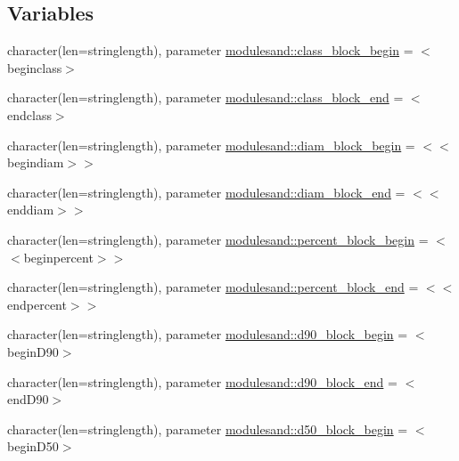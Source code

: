 \subsection*{Variables}
\begin{DoxyCompactItemize}
\item 
character(len=stringlength), parameter \mbox{\hyperlink{namespacemodulesand_a795643cefd171a7db1134d23315ba7d6}{modulesand\+::class\+\_\+block\+\_\+begin}} = \textquotesingle{}$<$beginclass$>$\textquotesingle{}
\item 
character(len=stringlength), parameter \mbox{\hyperlink{namespacemodulesand_a4998e9d59abb169c48298b823f3233eb}{modulesand\+::class\+\_\+block\+\_\+end}} = \textquotesingle{}$<$endclass$>$\textquotesingle{}
\item 
character(len=stringlength), parameter \mbox{\hyperlink{namespacemodulesand_add435f0a101432372b5402d3e60ff9f7}{modulesand\+::diam\+\_\+block\+\_\+begin}} = \textquotesingle{}$<$$<$begindiam$>$$>$\textquotesingle{}
\item 
character(len=stringlength), parameter \mbox{\hyperlink{namespacemodulesand_a060d45bf13a22de07462deb2c0661360}{modulesand\+::diam\+\_\+block\+\_\+end}} = \textquotesingle{}$<$$<$enddiam$>$$>$\textquotesingle{}
\item 
character(len=stringlength), parameter \mbox{\hyperlink{namespacemodulesand_ab5cb49dc51d45faf18b962a5c3f85a93}{modulesand\+::percent\+\_\+block\+\_\+begin}} = \textquotesingle{}$<$$<$beginpercent$>$$>$\textquotesingle{}
\item 
character(len=stringlength), parameter \mbox{\hyperlink{namespacemodulesand_aae26fa01d2e146d7d5f278f77a70fa34}{modulesand\+::percent\+\_\+block\+\_\+end}} = \textquotesingle{}$<$$<$endpercent$>$$>$\textquotesingle{}
\item 
character(len=stringlength), parameter \mbox{\hyperlink{namespacemodulesand_ac8ea818b42ebdcf5d37ba24d99c1d8a3}{modulesand\+::d90\+\_\+block\+\_\+begin}} = \textquotesingle{}$<$begin\+D90$>$\textquotesingle{}
\item 
character(len=stringlength), parameter \mbox{\hyperlink{namespacemodulesand_a3ccd7bede6595e8c01d41db55c580574}{modulesand\+::d90\+\_\+block\+\_\+end}} = \textquotesingle{}$<$end\+D90$>$\textquotesingle{}
\item 
character(len=stringlength), parameter \mbox{\hyperlink{namespacemodulesand_aeffe6964e3a87b520ec752ffb006f43a}{modulesand\+::d50\+\_\+block\+\_\+begin}} = \textquotesingle{}$<$begin\+D50$>$\textquotesingle{}
\item 

\end{DoxyCompactItemize}
